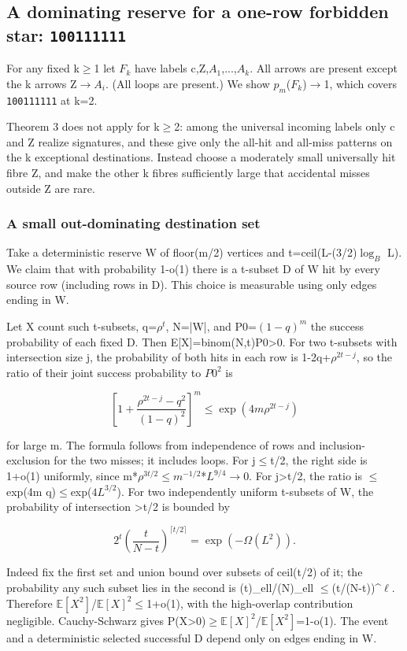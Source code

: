 \documentclass[11pt]{article}
\begin{document}
\subsection{A dominating reserve for a one-row forbidden star: \texttt{100111111}}

For any fixed k\ensuremath{\geq}1 let $F_{k}$ have labels c,Z,$A_{1}$,...,$A_{k}$. All arrows are present except the k arrows Z\ensuremath{\to}$A_{i}$. (All loops are present.) We show $p_m$($F_{k}$)\ensuremath{\to}1, which covers \texttt{100111111} at k=2.

Theorem 3 does not apply for k\ensuremath{\geq}2: among the universal incoming labels only c and Z realize signatures, and these give only the all-hit and all-miss patterns on the k exceptional destinations. Instead choose a moderately small universally hit fibre Z, and make the other k fibres sufficiently large that accidental misses outside Z are rare.

\subsubsection{A small out-dominating destination set}

Take a deterministic reserve W of floor(m/2) vertices and t=ceil(L-(3/2)$\log_B$ L). We claim that with probability 1-o(1) there is a t-subset D of W hit by every source row (including rows in D). This choice is measurable using only edges ending in W.

Let X count such t-subsets, q=$\rho^{t}$, N=|W|, and P0=$(1-q)^m$ the success probability of each fixed D. Then E[X]=binom(N,t)P0>0. For two t-subsets with intersection size j, the probability of both hits in each row is 1-2q+$\rho^{2t-j}$, so the ratio of their joint success probability to $P0^{2}$ is

\[
\left[1+\frac{\rho^{2t-j}-q^2}{(1-q)^2}\right]^m\leq\exp(4m\rho^{2t-j})
\]

for large m. The formula follows from independence of rows and inclusion-exclusion for the two misses; it includes loops. For j\ensuremath{\leq}t/2, the right side is 1+o(1) uniformly, since m*$\rho^{3t/2}$\ensuremath{\leq}$m^{-1/2}$*$L^{9/4}$\ensuremath{\to}0. For j>t/2, the ratio is \ensuremath{\leq}exp(4m q)\ensuremath{\leq}exp($4L^{3/2}$). For two independently uniform t-subsets of W, the probability of intersection >t/2 is bounded by

\[
2^t\left(\frac{t}{N-t}\right)^{\lceil t/2\rceil}=\exp(-\Omega(L^2)).
\]

Indeed fix the first set and union bound over subsets of ceil(t/2) of it; the probability any such subset lies in the second is (t)\_ell/(N)\_ell \ensuremath{\leq}(t/(N-t))\textasciicircum{}$\ell$. Therefore $\mathbb E[X^2]$/$\mathbb E[X]^2$\ensuremath{\leq}1+o(1), with the high-overlap contribution negligible. Cauchy-Schwarz gives P(X>0)\ensuremath{\geq}$\mathbb E[X]^2$/$\mathbb E[X^2]$=1-o(1). The event and a deterministic selected successful D depend only on edges ending in W.
\end{document}
